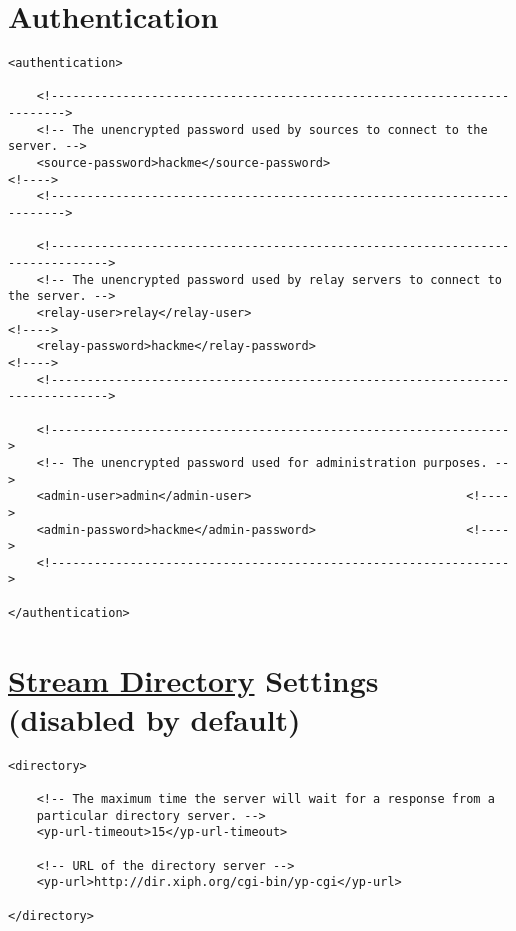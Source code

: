 
\section{Authentication}

\begin{lstlisting}
<authentication>

    <!------------------------------------------------------------------------>
    <!-- The unencrypted password used by sources to connect to the server. -->
    <source-password>hackme</source-password>                           <!---->
    <!------------------------------------------------------------------------>

    <!------------------------------------------------------------------------------>
    <!-- The unencrypted password used by relay servers to connect to the server. -->
    <relay-user>relay</relay-user>                                            <!---->
    <relay-password>hackme</relay-password>                                   <!---->
    <!------------------------------------------------------------------------------>
  
    <!---------------------------------------------------------------->
    <!-- The unencrypted password used for administration purposes. -->
    <admin-user>admin</admin-user>                              <!---->
    <admin-password>hackme</admin-password>                     <!---->
    <!---------------------------------------------------------------->

</authentication>
\end{lstlisting}


\section{\href{http://dir.xiph.org}{Stream Directory} Settings (disabled by default)}

\begin{lstlisting}
<directory>

    <!-- The maximum time the server will wait for a response from a
    particular directory server. -->
    <yp-url-timeout>15</yp-url-timeout>

    <!-- URL of the directory server -->
    <yp-url>http://dir.xiph.org/cgi-bin/yp-cgi</yp-url>

</directory>
\end{lstlisting}

